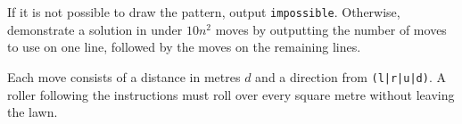 

If it is not possible to draw the pattern, output \texttt{impossible}. Otherwise, demonstrate a solution in
under $10n^2$ moves by outputting the number of moves to use on one line, followed by the moves on the remaining lines.

Each move consists of a distance in metres $d$ and a direction from \texttt{(l|r|u|d)}. A roller
following the instructions must roll over every square metre without leaving the lawn.
